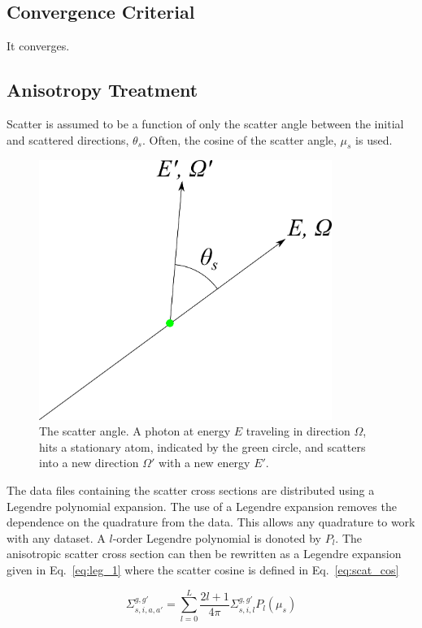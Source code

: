 \subsection{Convergence Criterial}
It converges.

\subsection{Anisotropy Treatment}

Scatter is assumed to be a function of only the scatter angle between the initial and scattered directions, $\theta_s$. Often, the cosine of the scatter angle, $\mu_s$ is used.

\begin{figure}[tb]
  \begin{center}
   \includegraphics[width=3.75in]{figs/scat_ang}
  \end{center}
  \caption{The scatter angle. A photon at energy $E$ traveling in direction $\Omega$, hits a stationary atom, indicated by the green circle, and scatters into a new direction $\Omega'$ with a new energy $E'$.}
\label{fig:scat_ang}
\end{figure}%

The data files containing the scatter cross sections are distributed using a Legendre polynomial expansion. The use of a Legendre expansion removes the dependence on the quadrature from the data. This allows any quadrature to work with any dataset. A $l$-order Legendre polynomial is donoted by $P_l$. The anisotropic scatter cross section can then be rewritten as a Legendre expansion given in Eq.~\ref{eq:leg_1} where the scatter cosine is defined in Eq.~\ref{eq:scat_cos}

\begin{equation} \label{eq:leg_1}
\Sigma_{s, i, a, a'}^{g, g'} = \sum_{l=0}^L \frac{2l+1}{4 \pi}\Sigma_{s, i, l}^{g, g'} P_l(\mu_s)
\end{equation}

